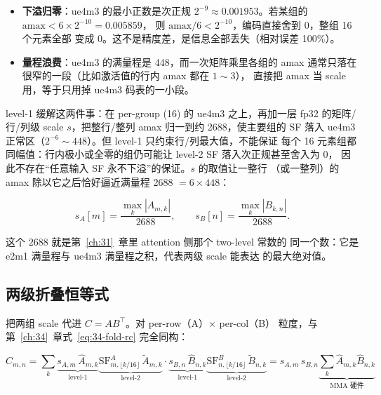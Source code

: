 \begin{itemize}[itemsep=2pt,topsep=3pt]
  \item \textbf{下溢归零}：ue4m3 的最小正数是次正规 $2^{-9} \approx
        0.001953$。若某组的 $\mathrm{amax} < 6\times 2^{-10} = 0.005859$，
        则 $\mathrm{amax}/6 < 2^{-10}$，编码直接舍到 0，整组 16 个元素全部
        变成 0。这不是精度差，是信息全部丢失（相对误差 100\%）。
  \item \textbf{量程浪费}：ue4m3 的满量程是 448，而一次矩阵乘里各组的
        amax 通常只落在很窄的一段（比如激活值的行内 amax 都在 $1\sim3$），
        直接把 amax 当 scale 用，等于只用掉 ue4m3 码表的一小段。
\end{itemize}

level-1 缓解这两件事：在 per-group (16) 的 ue4m3 之上，再加一层
fp32 的矩阵/行/列级 scale $s$，把整行/整列 amax 归一到约 2688，使主要组的 SF
落入 ue4m3 正常区（$2^{-6}\sim 448$）。但 level-1 只约束行/列最大值，不能保证
每个 16 元素组都同幅值：行内极小或全零的组仍可能让 level-2 SF 落入次正规甚至舍入为 0，
因此不存在“任意输入 SF 永不下溢”的保证。$s$ 的取值让一整行
（或一整列）的 amax 除以它之后恰好逼近满量程 2688 $= 6 \times 448$：

\begin{equation}
  s_A[m] = \frac{\max_k |A_{m,k}|}{2688},\qquad
  s_B[n] = \frac{\max_k |B_{k,n}|}{2688}.
  \label{eq:36-level1}
\end{equation}

这个 $2688$ 就是第~\ref{ch:31}~章里 attention 侧那个 two-level 常数的
同一个数：它是 e2m1 满量程与 ue4m3 满量程之积，代表两级 scale 能表达
的最大绝对值。

\subsection{两级折叠恒等式}

把两组 scale 代进 $C = A B^{\top}$。对 per-row（A）$\times$ per-col（B）
粒度，与第~\ref{ch:34}~章式~\ref{eq:34-fold-rc} 完全同构：

\begin{equation}
  C_{m,n} = \sum_k \underbrace{s_{A,m}\,\hat{A}_{m,k}}_{\text{level-1}}
                 \underbrace{\mathrm{SF}^A_{m,\lfloor k/16\rfloor}
                           \,\tilde{A}_{m,k}}_{\text{level-2}}
                 \cdot
                 \underbrace{s_{B,n}\,\hat{B}_{n,k}}_{\text{level-1}}
                 \underbrace{\mathrm{SF}^B_{n,\lfloor k/16\rfloor}
                           \,\tilde{B}_{n,k}}_{\text{level-2}}
          = s_{A,m}\,s_{B,n}
            \underbrace{\sum_{k}\hat{A}_{m,k}\hat{B}_{n,k}}_{\text{MMA 硬件}}
  \label{eq:36-fold}
\end{equation}

